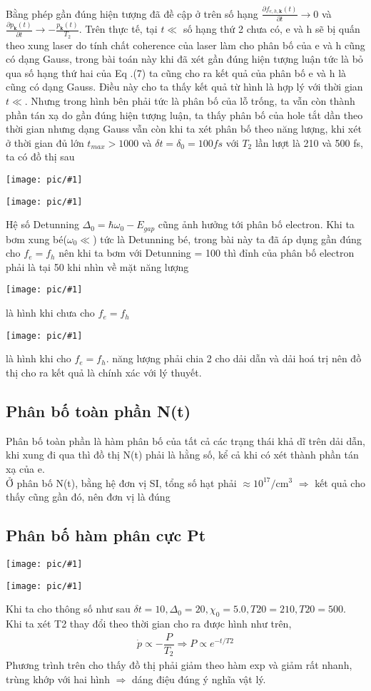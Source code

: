 \documentclass{article}
\newcommand{\image}[1]{
	\begin{center}
		\texttt{[image: pic/\#1]}
	\end{center}
}
\newcommand{\f}[2]{\dfrac{#1}{#2}}
\begin{document}
Bằng phép gần đúng hiện tượng đã đề cập ở trên số hạng $ \frac{\partial f_{e,h,\mathbf{k}}(t)}{\partial t} \rightarrow 0$ và $\frac{\partial p_{\mathbf{k}}(t)}{\partial t} \rightarrow - \frac{p_{\mathbf{k}}(t)}{T_{2}}$.
Trên thực tế, tại $t \ll $ số hạng thứ 2 chưa có, e và h sẽ bị quấn theo xung laser do tính chất coherence của laser làm cho phân bố của e và h cũng có dạng Gauss, trong bài toán này khi đã xét gần đúng hiện tượng luận tức là bỏ qua số hạng thứ hai của Eq .(7) ta cũng cho ra kết quả của phân bố e và h là cũng có dạng Gauss. Điều này cho ta thấy kết quả từ hình là hợp lý với thời gian $t \ll$. Nhưng trong hình bên phải tức là phân bố của lỗ trống, ta vẫn còn thành phần tán xạ do gần đúng hiện tượng luận, ta thấy phân bố của hole tắt dần theo thời gian nhưng dạng Gauss vẫn còn khi ta xét phân bố theo năng lượng, khi xét ở thời gian đủ lớn $t_{max} > 1000$ và $\delta {t} = \delta_{0} = 100 fs$ với $T_2$ lần lượt là 210 và 500 fs, ta có đồ thị sau
\image{pic8.png}
\image{pic7.png}
Hệ số Detunning $\Delta_{0} = \hbar \omega_{0} - E_{gap}$ cũng ảnh hưởng tới phân bố electron. Khi ta bơm xung bé($\omega_{0} \ll$) tức là Detunning bé, trong bài này ta đã áp dụng gần đúng cho $f_{e} = f_{h}$ nên khi ta bơm với Detunning = 100 thì đỉnh của phân bố electron phải là tại 50 khi nhìn về mặt năng lượng
\image{pic5.png}
là hình khi chưa cho $f_e = f_{h}$
\image{pic6.png}
là hình khi cho $f_e = f_{h}$. năng lượng phải chia 2 cho dải dẫn và dải hoá trị nên đồ thị cho ra kết quả là chính xác với lý thuyết.

\subsection{Phân bố toàn phần N(t)}
Phân bố toàn phần là hàm phân bố của tất cả các trạng thái khả dĩ trên dải dẫn, khi xung đi qua thì đồ thị N(t) phải là hằng số, kể cả khi có xét thành phần tán xạ của e.\\
Ở phân bố N(t), bằng hệ đơn vị SI, tổng số hạt phải $\approx 10^{17} /\text{cm}^{3}$ $\Rightarrow$ kết quả cho thấy cũng gần đó, nên đơn vị là đúng

\subsection{Phân bố hàm phân cực Pt}
\image{pt210.pdf}
\image{pt500.pdf}
Khi ta cho thông số như sau $\delta t = 10, \Delta_0 = 20, \chi_0 = 5.0, T20 = 210, T20 = 500$. Khi ta xét T2 thay đổi theo thời gian cho ra được hình như trên,
\begin{gather}
	\dot{p} \propto -\f{P}{T_{2}} \Rightarrow P \propto e^{-t/T2}
\end{gather}
Phương trình trên cho thấy đồ thị phải giảm theo hàm exp và giảm rất nhanh, trùng khớp với hai hình $\Rightarrow$ dáng điệu đúng ý nghĩa vật lý.
\end{document}

